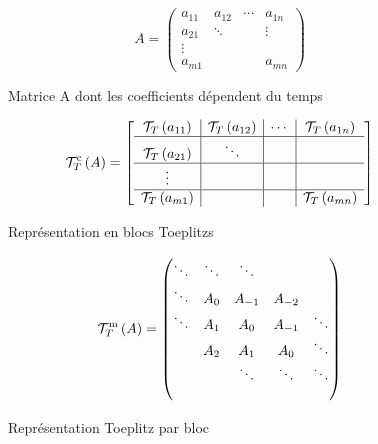 \documentclass[journal,onecolumn]{IEEEtran}
\begin{document}
\begin{figure}[h!]
\begin{equation}
    A = 
\begin{pmatrix}
a_{11} & a_{12} & \cdots & a_{1n}\\
a_{21} & \ddots & & \vdots\\
\vdots \\
a_{m1} & & & a_{mn}
\end{pmatrix} 
\end{equation}
\caption*{Matrice A dont les coefficients dépendent du temps }
\end{figure}


\begin{figure}[h!]
\begin{equation}
\mathcal{T}_{T}^\mathrm{c} \left( A \right)  = 
\left[\begin{array}{c|c|c|c}
\mathcal{T}_{T} \left( a_{11} \right) & \mathcal{T}_{T} \left( a_{12} \right) & \cdots  & \mathcal{T}_{T} \left( a_{1n} \right)\\ \hline
\mathcal{T}_{T} \left( a_{21} \right) & \ddots  & & \\ \hline
\vdots &  & & \\ \hline
\mathcal{T}_{T} \left( a_{m1} \right) & & &  \mathcal{T}_{T} \left( a_{mn} \right)   \\
\end{array} \right] 
\end{equation} 
\caption*{Représentation en blocs Toeplitzs }
\end{figure}


\begin{figure}[h!]
\begin{align}
    \mathcal{T}_{T}^\mathrm{m} \left( A \right) = \begin{pmatrix}
    \ddots & \ddots &  \ddots &  \\
        \ddots&A_0 & A_{-1} & A_{-2} \\
        \ddots &A_1 & A_{0} & A_{-1}&\ddots \\
        &A_2 & A_{1} & A_{0} &\ddots\\
        &&\ddots &\ddots &\ddots\\       
        & &  &  
    \end{pmatrix}
    \end{align}
\caption*{Représentation Toeplitz par bloc }
\end{figure}
\end{document}
